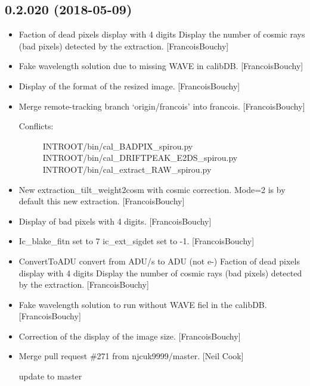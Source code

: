 \documentclass[a4paper,10pt,english]{report}
\begin{document}
\subsection{0.2.020 (2018-05-09)}
\label{\detokenize{misc/changelog:id440}}\begin{itemize}
\item {} 
Faction of dead pixels display with 4 digits Display the number of
cosmic rays (bad pixels) detected by the extraction. {[}FrancoisBouchy{]}

\item {} 
Fake wavelength solution due to missing WAVE in calibDB.
{[}FrancoisBouchy{]}

\item {} 
Display of the format of the resized image. {[}FrancoisBouchy{]}

\item {} 
Merge remote-tracking branch ‘origin/francois’ into francois.
{[}FrancoisBouchy{]}
\begin{description}
\item[{Conflicts:}] \leavevmode
INTROOT/bin/cal\_BADPIX\_spirou.py
INTROOT/bin/cal\_DRIFTPEAK\_E2DS\_spirou.py
INTROOT/bin/cal\_extract\_RAW\_spirou.py

\end{description}

\item {} 
New extraction\_tilt\_weight2cosm with cosmic correction. Mode=2 is by
default this new extraction. {[}FrancoisBouchy{]}

\item {} 
Display of bad pixels with 4 digits. {[}FrancoisBouchy{]}

\item {} 
Ic\_blake\_fitn set to 7 ic\_ext\_sigdet set to -1. {[}FrancoisBouchy{]}

\item {} 
ConvertToADU convert from ADU/s to ADU (not e-) Faction of dead pixels
display with 4 digits Display the number of cosmic rays (bad pixels)
detected by the extraction. {[}FrancoisBouchy{]}

\item {} 
Fake wavelength solution to run without WAVE fiel in the calibDB.
{[}FrancoisBouchy{]}

\item {} 
Correction of the display of the image size. {[}FrancoisBouchy{]}

\item {} 
Merge pull request \#271 from njcuk9999/master. {[}Neil Cook{]}

update to master

\end{itemize}
\end{document}
